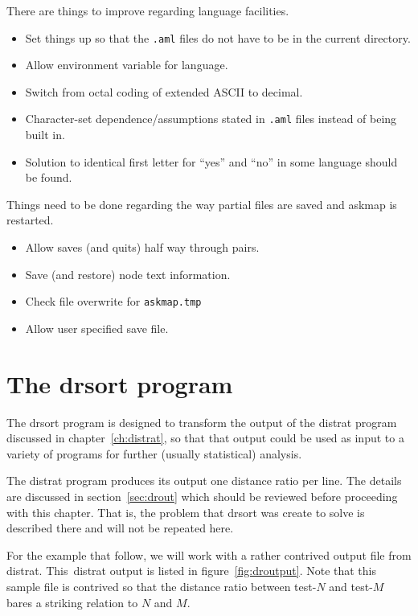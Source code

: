 \documentclass[%
	11pt,
        a4paper,
        twoside]{workrep}
\newcommand*{\prg}[1]{\textsf{#1}}		%
\newcommand*{\file}[1]{\texttt{#1}}		%
\begin{document}
\noindent
There are things to improve regarding language facilities.
\begin{itemize}
\item
 Set things up so that the \file{.aml} files do not have to be in the
   current directory.
\item
 Allow environment variable for language.
\item
 Switch from octal coding of extended ASCII to decimal.
\item
 Character-set dependence/assumptions stated in \file{.aml} files instead
   of being built in.
\item
 Solution to identical first letter for ``yes'' and ``no'' in some language
   should be found.
\end{itemize}

\noindent
Things need to be done regarding the way partial files are saved
and \prg{askmap} is restarted.
\begin{itemize}
\item Allow saves (and quits) half way through pairs.
\item Save (and restore) node text information.
\item Check file overwrite for \file{askmap.tmp}
\item Allow user specified save file.
\end{itemize}

\chapter{The \prg{drsort} program}\label{ch:drsort}

The \prg{drsort} program is designed to transform the output of the
\prg{distrat} program discussed in chapter~\ref{ch:distrat},
so that that output could be used as input to
a variety of programs for further (usually statistical) analysis.

The \prg{distrat} program produces its output one distance ratio per line.
The details are discussed in section~\ref{sec:drout} which should
be reviewed before proceeding with this chapter.  That is, the
problem that \prg{drsort} was create to solve is described there
and will not be repeated here.

For the example that follow, we will work with a rather contrived
output file from \prg{distrat}.  This~\prg{distrat} output is
listed in figure~\ref{fig:droutput}.
Note that this sample file is contrived so that the distance ratio
between test-$N$ and test-$M$ bares a striking relation to $N$ and $M$.
\end{document}
